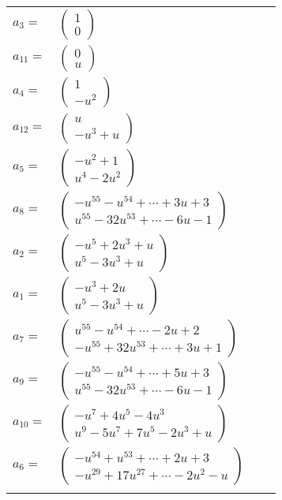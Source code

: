 \documentclass[1p]{elsarticle_modified}
\theoremstyle{definition}
\begin{document}
\begin{tabular}{m{7pt} m{180pt} m{7pt} m{180pt} }
\flushright $a_{3}=$&$\begin{pmatrix}1\\0\end{pmatrix}$ \\
\flushright $a_{11}=$&$\begin{pmatrix}0\\u\end{pmatrix}$ \\
\flushright $a_{4}=$&$\begin{pmatrix}1\\- u^2\end{pmatrix}$ \\
\flushright $a_{12}=$&$\begin{pmatrix}u\\- u^3+u\end{pmatrix}$ \\
\flushright $a_{5}=$&$\begin{pmatrix}- u^2+1\\u^4-2 u^2\end{pmatrix}$ \\
\flushright $a_{8}=$&$\begin{pmatrix}- u^{55}- u^{54}+\cdots+3 u+3\\u^{55}-32 u^{53}+\cdots-6 u-1\end{pmatrix}$ \\
\flushright $a_{2}=$&$\begin{pmatrix}- u^5+2 u^3+u\\u^5-3 u^3+u\end{pmatrix}$ \\
\flushright $a_{1}=$&$\begin{pmatrix}- u^3+2 u\\u^5-3 u^3+u\end{pmatrix}$ \\
\flushright $a_{7}=$&$\begin{pmatrix}u^{55}- u^{54}+\cdots-2 u+2\\- u^{55}+32 u^{53}+\cdots+3 u+1\end{pmatrix}$ \\
\flushright $a_{9}=$&$\begin{pmatrix}- u^{55}- u^{54}+\cdots+5 u+3\\u^{55}-32 u^{53}+\cdots-6 u-1\end{pmatrix}$ \\
\flushright $a_{10}=$&$\begin{pmatrix}- u^7+4 u^5-4 u^3\\u^9-5 u^7+7 u^5-2 u^3+u\end{pmatrix}$ \\
\flushright $a_{6}=$&$\begin{pmatrix}- u^{54}+u^{53}+\cdots+2 u+3\\- u^{29}+17 u^{27}+\cdots-2 u^2- u\end{pmatrix}$\\&\end{tabular}
\end{document}
